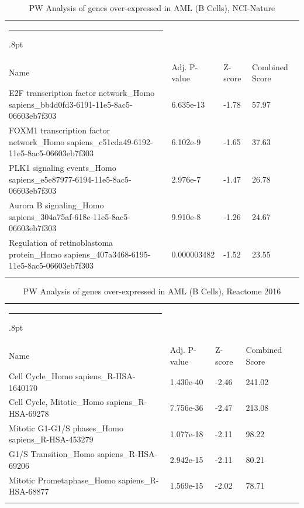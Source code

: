 \documentclass[3p,authoryear,preprint,12pt]{elsarticle}
\makeatletter
\def\hlinewd#1{%
  \noalign{\ifnum0=`}\fi\hrule \@height #1%
  \futurelet\reserved@a\@xhline}
\def\tbltoprule{\hlinewd{.8pt}\\[-12pt]}
\def\tblbottomrule{\noalign{\vspace*{6pt}}\hline\noalign{\vspace*{2pt}}}
\def\tblmidrule{\noalign{\vspace*{6pt}}\hline\noalign{\vspace*{2pt}}}
\makeatother
\begin{document}
\begin{table}[!htbp]
	\caption{{PW Analysis of genes over-expressed in AML (B Cells), NCI-Nature} }
	\label{tw-de478ae31dc6}
	\def\arraystretch{1}
	\ignorespaces 
	\centering 
	\begin{tabulary}{\linewidth}{p{\dimexpr.65\tabcolsep}p{\dimexpr.15\tabcolsep}p{\dimexpr.1\tabcolsep}p{\dimexpr.1\tabcolsep}}
		\tbltoprule Name & Adj. P-value & Z-score & Combined Score\\
		\tblmidrule
E2F transcription factor network\_Homo sapiens\_bb4d0fd3-6191-11e5-8ac5-06603eb7f303 & 6.635e-13 & -1.78 & 57.97 \\
FOXM1 transcription factor network\_Homo sapiens\_c51cda49-6192-11e5-8ac5-06603eb7f303 & 6.102e-9 & -1.65 & 37.63 \\
PLK1 signaling events\_Homo sapiens\_e5e87977-6194-11e5-8ac5-06603eb7f303 & 2.976e-7 & -1.47 & 26.78 \\
Aurora B signaling\_Homo sapiens\_304a75af-618c-11e5-8ac5-06603eb7f303 & 9.910e-8 & -1.26 & 24.67 \\
Regulation of retinoblastoma protein\_Homo sapiens\_407a3468-6195-11e5-8ac5-06603eb7f303 & 0.000003482 & -1.52 & 23.55 \\
		\tblbottomrule
	\end{tabulary}\par 
\end{table}
\begin{table}[!htbp]
	\caption{{PW Analysis of genes over-expressed in AML (B Cells), Reactome 2016} }
	\label{tw-de478ae31ec6}
	\def\arraystretch{1}
	\ignorespaces 
	\centering 
	\begin{tabulary}{\linewidth}{p{\dimexpr.65\tabcolsep}p{\dimexpr.15\tabcolsep}p{\dimexpr.1\tabcolsep}p{\dimexpr.1\tabcolsep}}
		\tbltoprule Name & Adj. P-value & Z-score & Combined Score\\
		\tblmidrule
Cell Cycle\_Homo sapiens\_R-HSA-1640170 & 1.430e-40 & -2.46 & 241.02 \\
Cell Cycle, Mitotic\_Homo sapiens\_R-HSA-69278 & 7.756e-36 & -2.47 & 213.08 \\
Mitotic G1-G1/S phases\_Homo sapiens\_R-HSA-453279 & 1.077e-18 & -2.11 & 98.22 \\
G1/S Transition\_Homo sapiens\_R-HSA-69206 & 2.942e-15 & -2.11 & 80.21 \\
Mitotic Prometaphase\_Homo sapiens\_R-HSA-68877 & 1.569e-15 & -2.02 & 78.71 \\
		\tblbottomrule
	\end{tabulary}\par 
\end{table}
\end{document}
